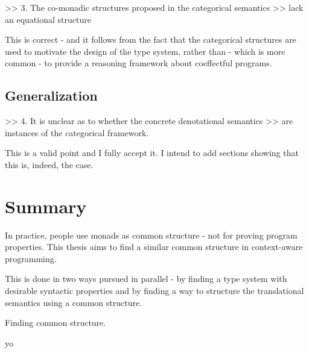\documentclass[
		twoside,openright,titlepage,numbers=noenddot,headinclude,%
                footinclude=true,cleardoublepage=empty,
                BCOR=10mm,paper=a4,fontsize=10pt, %
                ngerman,american, %
                ]{scrreprt}
\begin{document}
>> 3. The co-monadic structures proposed in the categorical semantics
>> lack an equational structure

This is correct - and it follows from the fact that the categorical structures are used to motivate
the design of the type system, rather than - which is more common - to provide a reasoning
framework about coeffectful programs.

\subsection{Generalization}

>> 4. It is unclear as to whether the concrete denotational semantics
>> are instances of the categorical framework.

This is a valid point and I fully accept it. I intend to add sections showing that this is, indeed, the case.


\section{Summary}

In practice, people use monads as common structure - not for proving program properties.
This thesis aims to find a similar common structure in context-aware programming.

This is done in two ways pursued in parallel - by finding a type system with desirable syntactic
properties and by finding a way to structure the translational semantics using a common structure.

Finding common structure.

yo



\end{document}
